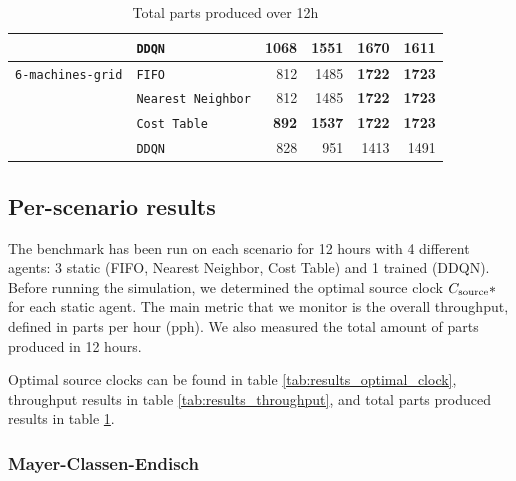 \documentclass[sn-mathphys]{sn-jnl}
\begin{document}
\begin{table}[ht]
\begin{tabular}{|l|l||r|r|r|r|}
 & \texttt{DDQN} & 1068  \quad & 1551  \quad & 1670  \quad & 1611  \quad  \\ 
\hline \texttt{6-machines-grid} & \texttt{FIFO}& 812  \quad & 1485  \quad & \textbf{1722} \quad & \textbf{1723} \quad  \\ 
 & \texttt{Nearest Neighbor} & 812  \quad & 1485  \quad & \textbf{1722} \quad & \textbf{1723} \quad  \\ 
 & \texttt{Cost Table} & \textbf{892} \quad & \textbf{1537} \quad & \textbf{1722} \quad & \textbf{1723} \quad  \\ 
 & \texttt{DDQN} & 828  \quad & 951  \quad & 1413  \quad & 1491  \quad  \\ 
\hline
\end{tabular}

\egroup
\caption{Total parts produced over 12h}
\label{tab:results_total_parts}
\end{table}

\subsection{Per-scenario results}

The benchmark has been run on each scenario for 12 hours with 4 different agents: 3 static (FIFO, Nearest Neighbor, Cost Table) and 1 trained (DDQN). Before running the simulation, we determined the optimal source clock $C_{\rm source}*$ for each static agent. The main metric that we monitor is the overall throughput, defined in parts per hour (pph). We also measured the total amount of parts produced in 12 hours.

Optimal source clocks can be found in table \ref{tab:results_optimal_clock}, throughput results in table \ref{tab:results_throughput}, and total parts produced results in table \ref{tab:results_total_parts}.

\subsubsection{Mayer-Classen-Endisch}
\end{document}
